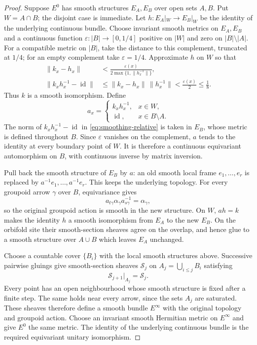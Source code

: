 \documentclass[11pt,a4paper,reqno]{amsart}
\numberwithin{equation}{section}
\theoremstyle{remark}
\theoremstyle{plain}
\newcommand{\id}{\operatorname{id}}
\begin{document}
\begin{proof}
Suppose $E^0$ has smooth structures $E_A,E_B$ over open sets $A,B$. Put
$W=A\cap B$; the disjoint case is immediate. Let
$h:E_A|_W\to E_B|_W$ be the identity of the underlying continuous bundle.
Choose invariant smooth metrics on $E_A,E_B$ and a continuous function
$\varepsilon:|B|\to[0,1/4]$ positive on $|W|$ and zero on
$|B|\setminus|A|$. For a compatible metric on $|B|$, take the distance to this complement,
truncated at $1/4$; for an empty complement take $\varepsilon=1/4$.
Approximate $h$ on $W$ so that
\begin{equation}\label{eq:smoothing-relative}
 \begin{aligned}
 \|k_x-h_x\|&<\frac{\varepsilon(x)}
                   {2\max\{1,\|h_x^{-1}\|\}},\\
 \|k_xh_x^{-1}-\id\|&\leq\|k_x-h_x\|\,\|h_x^{-1}\|
             <\frac{\varepsilon(x)}2\leq\frac18.
 \end{aligned}
\end{equation}
Thus $k$ is a smooth isomorphism. Define
\begin{equation}\label{eq:smoothing-correction}
 a_x=\begin{cases}
       k_xh_x^{-1},&x\in W,\\
       \id,&x\in B\setminus A.
      \end{cases}
\end{equation}
The norm of $k_xh_x^{-1}-\id$ in \eqref{eq:smoothing-relative} is taken in
$E_B$, whose metric is defined throughout $B$. Since $\varepsilon$ vanishes
on the complement,
$a$ tends to the identity at every boundary point of $W$. It is therefore
a continuous equivariant automorphism on $B$, with continuous inverse by
matrix inversion.

Pull back the smooth structure of $E_B$ by $a$: an old smooth local frame
$e_1,\ldots,e_r$ is replaced by $a^{-1}e_1,\ldots,a^{-1}e_r$. This keeps
the underlying topology. For every groupoid arrow $\gamma$ over $B$, equivariance
gives
\[
 a_{t\gamma}\alpha_\gamma a_{s\gamma}^{-1}=\alpha_\gamma,
\]
so the original groupoid action is smooth in the new structure. On $W$,
$a h=k$ makes the identity $h$ a smooth isomorphism from $E_A$ to the new
$E_B$. On the orbifold site their smooth-section sheaves agree on the overlap,
and hence glue to a smooth structure over $A\cup B$ which leaves $E_A$
unchanged.

Choose a countable cover $\{B_i\}$ with the local smooth structures above.
Successive pairwise gluings give smooth-section sheaves $\mathcal S_j$ on
$A_j=\bigcup_{i\leq j}B_i$ satisfying
\begin{equation}\label{eq:smoothing-stationary}
 \mathcal S_{j+1}|_{A_j}=\mathcal S_j.
\end{equation}
Every point has an open neighbourhood whose smooth structure is fixed
after a finite step. The same holds near every arrow, since the sets $A_j$
are saturated. These sheaves therefore define a smooth bundle $E^\infty$
with the original topology and groupoid action. Choose an invariant smooth Hermitian metric
on $E^\infty$ and give $E^0$ the same metric. The identity of the underlying
continuous bundle is the required equivariant unitary isomorphism.
\end{proof}
\end{document}
